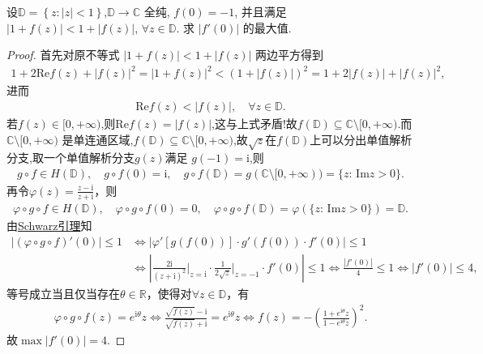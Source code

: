\documentclass[../../main.tex]{subfiles}%
\begin{document}
\begin{example}
设$\mathbb{D} =\left\{ z:\left| z \right|<1 \right\}$,$\mathbb{D} \to \mathbb{C}$ 全纯, $f(0) = -1$, 并且满足 $|1 + f(z)| < 1 + |f(z)|$, $\forall z \in \mathbb{D}$. 求 $|f'(0)|$ 的最大值.
\end{example}
\begin{proof}

首先对原不等式 $|1 + f(z)| < 1 + |f(z)|$ 两边平方得到
\begin{align*}
1 + 2\mathrm{Re}f(z) + |f(z)|^2 = |1 + f(z)|^2  < (1 + |f(z)|)^2 = 1 + 2|f(z)| + |f(z)|^2,
\end{align*}
进而
\begin{align*}
\mathrm{Re}f(z) < |f(z)|, \quad \forall z \in \mathbb{D}.
\end{align*}
若$f(z)\in [0,+\infty)$,则$\mathrm{Re}f(z)=|f(z)|$,这与上式矛盾!故$f(\mathbb{D}) \subseteq \mathbb{C} \setminus [0,+\infty).$而 $\mathbb{C} \setminus [0,+\infty)$ 是单连通区域,$f(\mathbb{D}) \subseteq \mathbb{C} \setminus [0,+\infty)$,故$\sqrt{z}$在$f(\mathbb{D})$上可以分出单值解析分支,取一个单值解析分支$g(z)$满足 $g(-1) = \mathrm{i}$,则
\begin{align*}
g\circ f\in H(\mathbb{D} ),\quad g\circ f(0)=\mathrm{i},\quad g\circ f(\mathbb{D} )=g(\mathbb{C} \setminus [0,+\infty ))=\{z:\,\mathrm{Im}z>0\}.
\end{align*}
再令$\varphi(z)=\frac{z-\mathrm{i}}{z+\mathrm{i}}$，则
\begin{align*}
\varphi\circ g\circ f\in H(\mathbb{D}),\quad \varphi\circ g\circ f(0)=0,\quad \varphi\circ g\circ f(\mathbb{D})=\varphi(\{z:\,\mathrm{Im}z>0\})=\mathbb{D}.
\end{align*}
由\hyperref[theorem:Schwarz引理-定理4.5.3]{Schwarz引理}知
\begin{align*}
\left|(\varphi\circ g\circ f)'(0)\right|\leqslant 1&\Longleftrightarrow \left|\varphi'\left[g(f(0))\right]\cdot g'(f(0))\cdot f'(0)\right|\leqslant 1\\
&\Longleftrightarrow \left|\frac{2\mathrm{i}}{(z+\mathrm{i})^2}\bigg|_{z=\mathrm{i}}\cdot \frac{1}{2\sqrt{z}}\bigg|_{z=-1}\cdot f'(0)\right|\leqslant 1\Longleftrightarrow \frac{|f'(0)|}{4}\leqslant 1\Longleftrightarrow |f'(0)|\leqslant 4,
\end{align*}
等号成立当且仅当存在$\theta\in\mathbb{R}$，使得对$\forall z\in\mathbb{D}$，有
\begin{align*}
\varphi\circ g\circ f(z)=e^{\mathrm{i}\theta}z\Longleftrightarrow \frac{\sqrt{f(z)}-\mathrm{i}}{\sqrt{f(z)}+\mathrm{i}}=e^{\mathrm{i}\theta}z\Longleftrightarrow f(z)=-\left(\frac{1+e^{\mathrm{i}\theta}z}{1-e^{\mathrm{i}\theta}z}\right)^2.
\end{align*}
故$\max \left| f' \left( 0 \right) \right|=4$.

\end{proof}
\end{document}
